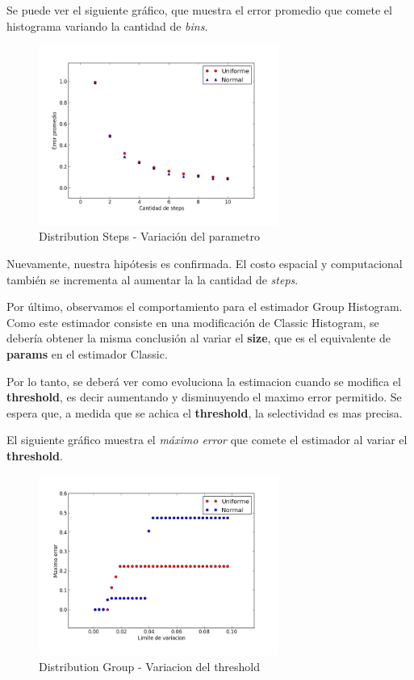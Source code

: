\documentclass[10pt, a4paper,english,spanish,hidelinks]{article}
\begin{document}
Se puede ver el siguiente gráfico, que muestra el error promedio que comete el histograma variando
la cantidad de \textit{bins}.

\newpage
\begin{figure}
  \centering
  \includegraphics[width=0.7\textwidth]{./imagenes/ejb2_step_parameter_variation.png}
  \caption{Distribution Steps - Variación del parametro}
\end{figure}

Nuevamente, nuestra hipótesis es confirmada. El costo espacial y computacional también se incrementa al aumentar la 
la cantidad de \textit{steps}.

Por último, observamos el comportamiento para el estimador Group Histogram. 
Como este estimador consiste en una modificación de Classic Histogram, se debería obtener la misma
conclusión al variar el \textbf{size}, que es el equivalente de \textbf{params} en el estimador Classic.

Por lo tanto, se deberá ver como evoluciona la estimacion cuando se modifica el
\textbf{threshold}, es decir aumentando y disminuyendo el maximo error permitido.
Se espera que, a medida que se achica el \textbf{threshold}, la selectividad es mas precisa.

El siguiente gráfico muestra el \textit{máximo error} que comete el estimador
al variar el \textbf{threshold}.
\newpage
\begin{figure}
  \centering
  \includegraphics[width=0.7\textwidth]{./imagenes/ejb2_group_parameter_variation.png}
  \caption{Distribution Group - Variacion del threshold}
\end{figure}
\end{document}
